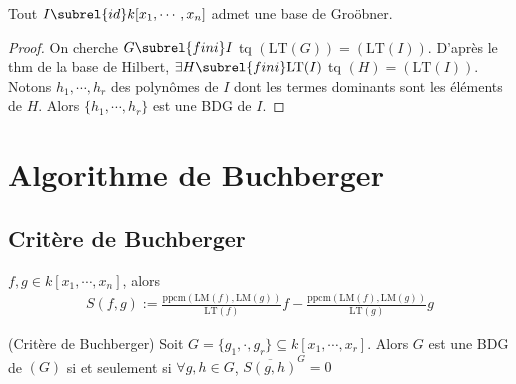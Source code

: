             \begin{theo}
                Tout $I \subrel{id} k[x_1, \cdots, x_n]$ admet une base de Groöbner.
            \end{theo}
            \begin{proof}
                On cherche $G \subrel{fini} I$ tq $(\mathrm{LT}(G)) = (\mathrm{LT}(I))$. D'après le thm de la base de Hilbert, $\exists H \subrel{fini} \mathrm{LT}(I)$ tq $(H) = (\mathrm{LT}(I))$. Notons $h_1, \cdots, h_r$ des polynômes de $I$ dont les termes dominants sont les éléments de $H$. Alors $\{h_1, \cdots, h_r\}$ est une BDG de $I$.
            \end{proof}

    \section{Algorithme de Buchberger}
        \subsection{Critère de Buchberger}
            \begin{defi}
                $f,g \in k[x_1, \cdots, x_n]$, alors
                \begin{align*}
                    S(f,g) := \frac{\mathrm{ppcm} (\mathrm{LM}(f), \mathrm{LM}(g))}{\mathrm{LT}(f)}f - \frac{\mathrm{ppcm} (\mathrm{LM}(f), \mathrm{LM}(g))}{\mathrm{LT}(g)}g
                \end{align*}
            \end{defi}
            \begin{theo} (Critère de Buchberger)
                Soit $G = \{g_1, \cdot, g_r\} \subseteq k[x_1, \cdots, x_r]$. Alors $G$ est une BDG de $(G)$ si et seulement si $\forall g,h \in G$, $\overline{S(g,h)}^G = 0$
            \end{theo}